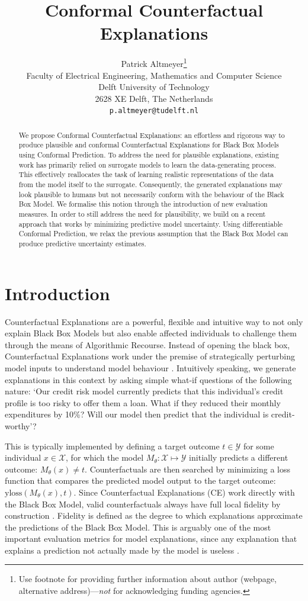 \documentclass{article}
\title{Conformal Counterfactual Explanations}
\author{%
  Patrick Altmeyer\thanks{Use footnote for providing further information
    about author (webpage, alternative address)---\emph{not} for acknowledging
    funding agencies.} \\
  Faculty of Electrical Engineering, Mathematics and Computer Science\\
  Delft University of Technology\\
  2628 XE Delft, The Netherlands \\
  \texttt{p.altmeyer@tudelft.nl} \\
}
\begin{document}
\maketitle

\begin{abstract}
  We propose Conformal Counterfactual Explanations: an effortless and rigorous way to produce plausible and conformal Counterfactual Explanations for Black Box Models using Conformal Prediction. To address the need for plausible explanations, existing work has primarily relied on surrogate models to learn the data-generating process. This effectively reallocates the task of learning realistic representations of the data from the model itself to the surrogate. Consequently, the generated explanations may look plausible to humans but not necessarily conform with the behaviour of the Black Box Model. We formalise this notion through the introduction of new evaluation measures. In order to still address the need for plausibility, we build on a recent approach that works by minimizing predictive model uncertainty. Using differentiable Conformal Prediction, we relax the previous assumption that the Black Box Model can produce predictive uncertainty estimates.
\end{abstract}

\section{Introduction}\label{intro}

Counterfactual Explanations are a powerful, flexible and intuitive way to not only explain Black Box Models but also enable affected individuals to challenge them through the means of Algorithmic Recourse. Instead of opening the black box, Counterfactual Explanations work under the premise of strategically perturbing model inputs to understand model behaviour \citep{wachter2017counterfactual}. Intuitively speaking, we generate explanations in this context by asking simple what-if questions of the following nature: `Our credit risk model currently predicts that this individual's credit profile is too risky to offer them a loan. What if they reduced their monthly expenditures by 10\%? Will our model then predict that the individual is credit-worthy'? 

This is typically implemented by defining a target outcome $t \in \mathcal{Y}$ for some individual $x \in \mathcal{X}$, for which the model $M_{\theta}:\mathcal{X}\mapsto\mathcal{Y}$ initially predicts a different outcome: $M_{\theta}(x)\ne t$. Counterfactuals are then searched by minimizing a loss function that compares the predicted model output to the target outcome: $\text{yloss}(M_{\theta}(x),t)$. Since Counterfactual Explanations (CE) work directly with the Black Box Model, valid counterfactuals always have full local fidelity by construction \citep{mothilal2020explaining}. Fidelity is defined as the degree to which explanations approximate the predictions of the Black Box Model. This is arguably one of the most important evaluation metrics for model explanations, since any explanation that explains a prediction not actually made by the model is useless \citep{molnar2020interpretable}. 
\end{document}
